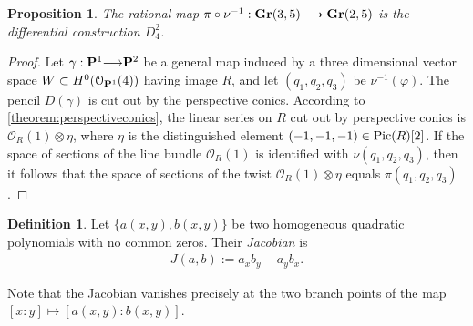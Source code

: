 \documentclass[11pt,reqno]{amsart}
\theoremstyle{plain}
\newtheorem{proposition}[theorem]{Proposition}
\theoremstyle{definition}
\newtheorem{definition}[theorem]{Definition}
\theoremstyle{remark}
\numberwithin{equation}{section}
\newcommand{\todo}[1]{\fbox{ToDo: #1}}
\renewcommand{\to}{{\longrightarrow}}
\numberwithin{equation}{section}
\renewcommand{\O}{\mathcal O}
\begin{document}
\begin{proposition}
  \label{proposition:reinterpretTangent}
  The rational map $\pi \circ \nu^{-1} : {\bf Gr}(3,5) \dashrightarrow {\bf Gr}(2,5)$ is the differential construction $D^{2}_{4}$.
\end{proposition}
\begin{proof}
  Let $\gamma : \P^{1} \to \P^{2}$ be a general map induced by a three dimensional vector space $W \subset H^{0}(\O_{\P^{1}}(4))$ having image $R$, and let $(q_{1},q_{2},q_{3})$ be $\nu^{-1}(\varphi)$. The pencil $D(\gamma)$ is cut out by the perspective conics. \todo{Why?} According to \autoref{theorem:perspectiveconics}, the linear series on $R$ cut out by perspective conics is $\O_{R}(1) \otimes \eta$, where $\eta$ is the distinguished element $(-1,-1,-1) \in \operatorname{Pic}(R)[2]$.
  If the space of sections of the line bundle $\O_{R}(1)$ is identified with $\nu(q_{1},q_{2},q_{3})$, then it follows that the space of sections of the twist $\O_{R}(1)\otimes \eta$ equals $\pi(q_{1},q_{2},q_{3})$. 
\end{proof}

\begin{definition}
  \label{definition:jacobiantwoquadrics}
  Let $\{a(x,y),b(x,y)\}$ be two homogeneous quadratic polynomials with no common zeros. Their {\sl Jacobian} is
  \begin{align*}
    J(a,b):= a_{x}b_{y}-a_{y}b_{x}.
  \end{align*}

\end{definition}

Note that the Jacobian vanishes precisely at the two branch points of the map $[x : y] \mapsto [a(x,y):b(x,y)]$.
\end{document}
